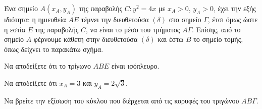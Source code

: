 Ένα σημείο $A(x_A, y_A)$ της παραβολής $C: y^2 = 4x$ με $x_A > 0$, $y_A > 0$, έχει την εξής ιδιότητα: η ημιευθεία $AE$ τέμνει την διευθετούσα $(\delta)$ στο σημείο $\Gamma$, έτσι όμως ώστε η εστία $E$ της παραβολής $C$, να είναι το μέσο του τμήματος $A\Gamma$. Επίσης, από το σημείο $A$ φέρνουμε κάθετη στην διευθετούσα $(\delta)$ και έστω $B$ το σημείο τομής, όπως δείχνει το παρακάτω σχήμα.

\begin{alist}
\item Να αποδείξετε ότι το τρίγωνο $ABE$ είναι ισόπλευρο. 
\item Να αποδείξετε ότι $x_A = 3$ και $y_A = 2\sqrt{3}$. 
\item Να βρείτε την εξίσωση του κύκλου που διέρχεται από τις κορυφές του τριγώνου $AB\Gamma$. 
\end{alist}